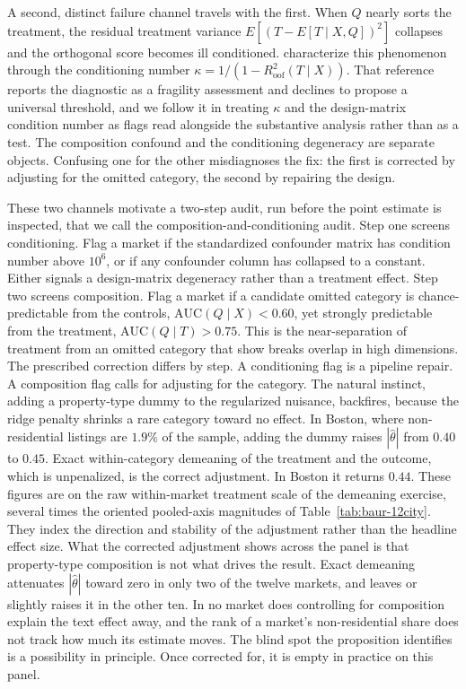 A second, distinct failure channel travels with the first. When $Q$ nearly sorts the treatment, the residual treatment variance $E[(T - E[T \mid X, Q])^2]$ collapses and the orthogonal score becomes ill conditioned. \citet{saco2025illconditioned} characterize this phenomenon through the conditioning number $\kappa = 1/(1 - R^2_{\text{oof}}(T \mid X))$. That reference reports the diagnostic as a fragility assessment and declines to propose a universal threshold, and we follow it in treating $\kappa$ and the design-matrix condition number as flags read alongside the substantive analysis rather than as a test. The composition confound and the conditioning degeneracy are separate objects. Confusing one for the other misdiagnoses the fix: the first is corrected by adjusting for the omitted category, the second by repairing the design.

These two channels motivate a two-step audit, run before the point estimate is
inspected, that we call the composition-and-conditioning audit. Step one screens conditioning. Flag a market if the standardized confounder matrix has condition number above $10^6$, or if any confounder column has collapsed to a constant. Either signals a design-matrix degeneracy rather than a treatment effect. Step two screens composition. Flag a market if a candidate omitted category is chance-predictable from the controls, $\mathrm{AUC}(Q \mid X) < 0.60$, yet strongly predictable from the treatment, $\mathrm{AUC}(Q \mid T) > 0.75$. This is the near-separation of treatment from an omitted category that \citet{damour2021overlap} show breaks overlap in high dimensions. The prescribed
correction differs by step. A conditioning flag is a pipeline repair. A composition flag calls for adjusting for the category. The natural instinct, adding a property-type dummy to the regularized nuisance, backfires, because the ridge penalty shrinks a rare category toward no effect. In Boston, where non-residential listings are $1.9\%$ of the sample, adding the dummy raises $|\hat\theta|$ from $0.40$ to $0.45$. Exact within-category demeaning of the treatment and the outcome, which is unpenalized, is the correct adjustment. In Boston it returns $0.44$. These figures are on the raw within-market treatment scale of the demeaning exercise, several times the oriented pooled-axis magnitudes of Table~\ref{tab:baur-12city}. They index the direction and stability of the adjustment rather than the headline effect size. What the corrected adjustment shows across the panel is that property-type composition is not what drives the result. Exact demeaning attenuates $|\hat\theta|$ toward zero in only two of the twelve markets, and leaves or slightly raises it in the other ten. In no market does controlling for composition explain the text effect away, and the rank of a market's non-residential share does not track how much its estimate moves. The blind spot the proposition identifies is a possibility in principle. Once corrected for, it is empty in practice on this panel.

